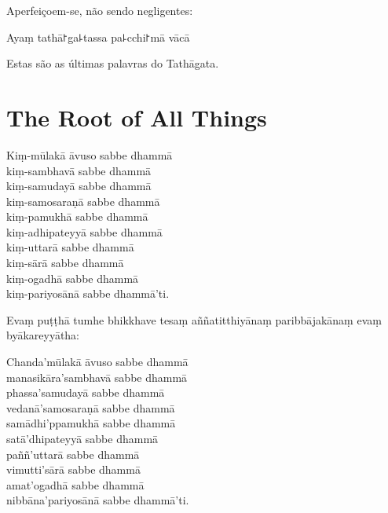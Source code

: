 \begin{english}
  Aperfeiçoem-se, não sendo negligentes:
\end{english}

Ayaṃ tathā꜓ga꜕tassa pa꜕cchi꜓mā vācā

\begin{english}
  Estas são as últimas palavras do Tathāgata.
\end{english}

\chapter{The Root of All Things}



\begin{leader}
\end{leader}

\enlargethispage{2\baselineskip}

Kiṃ-mūlakā āvuso sabbe dhammā\\
kiṃ-sambhavā sabbe dhammā\\
kiṃ-samudayā sabbe dhammā\\
kiṃ-samosaraṇā sabbe dhammā\\
kiṃ-pamukhā sabbe dhammā\\
kiṃ-adhipateyyā sabbe dhammā\\
kiṃ-uttarā sabbe dhammā\\
kiṃ-sārā sabbe dhammā\\
kiṃ-ogadhā sabbe dhammā\\
kiṃ-pariyosānā sabbe dhammā'ti.

Evaṃ puṭṭhā tumhe bhikkhave tesaṃ aññatitthiyānaṃ paribbājakānaṃ evaṃ byākareyyātha:

Chanda'mūlakā āvuso sabbe dhammā\\
manasikāra'sambhavā sabbe dhammā\\
phassa'samudayā sabbe dhammā\\
vedanā'samosaraṇā sabbe dhammā\\
samādhi'ppamukhā sabbe dhammā\\
satā'dhipateyyā sabbe dhammā\\
paññ'uttarā sabbe dhammā\\
vimutti'sārā sabbe dhammā\\
amat'ogadhā sabbe dhammā\\
nibbāna'pariyosānā sabbe dhammā'ti.

